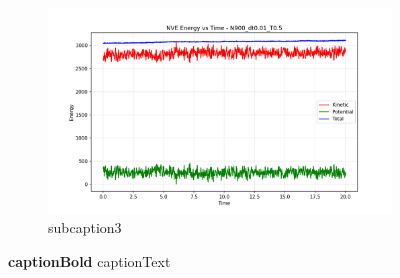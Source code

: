 \begin{figure}[H]
\begin{subfigure}{0.5\textwidth}
	\end{subfigure}
	~
	\begin{subfigure}{0.5\textwidth}
		\includegraphics[width=\textwidth]{media/energy_N900_dt0.01_T0.5.png}
		\caption{subcaption3}
		\label{sfig:sublabel3}
	\end{subfigure}%
	\caption{\textbf{captionBold}
		captionText
	}
	\label{fig:figureLabel}
\end{figure}
